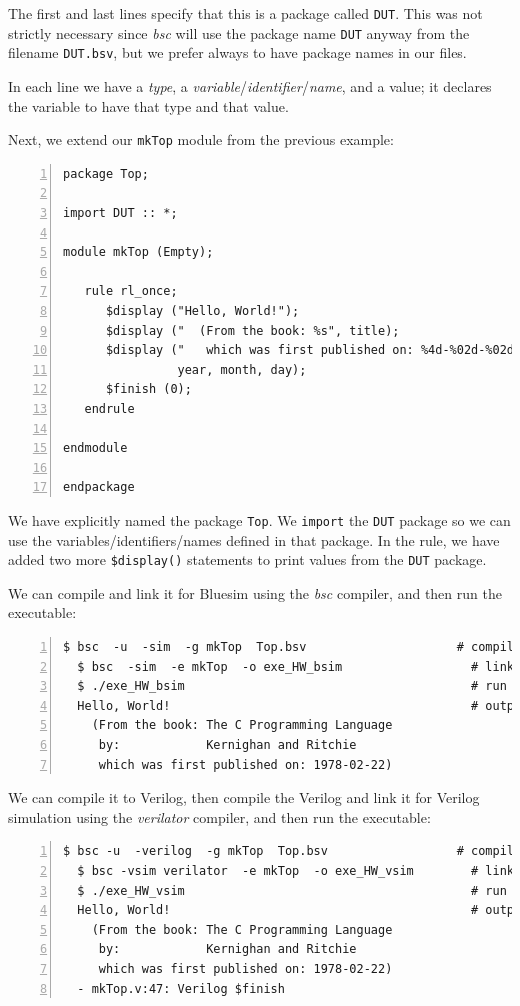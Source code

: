 The first and last lines specify that this is a package called
\verb|DUT|.  This was not strictly necessary since \emph{bsc} will use
the package name \verb|DUT| anyway from the filename \verb|DUT.bsv|,
but we prefer always to have package names in our files.

In each line we have a \emph{type}, a
\emph{variable}/\emph{identifier}/\emph{name}, and a value; it
declares the variable to have that type and that value.

Next, we extend our \verb|mkTop| module from the previous example:

{\small
\begin{Verbatim}[frame=single, numbers=left, label=in file Ex\_04\_02/Top.bsv]
package Top;

import DUT :: *;

module mkTop (Empty);

   rule rl_once;
      $display ("Hello, World!");
      $display ("  (From the book: %s", title);
      $display ("   which was first published on: %4d-%02d-%02d)",
                year, month, day);
      $finish (0);
   endrule

endmodule

endpackage
\end{Verbatim}
}

We have explicitly named the package \verb|Top|.  We \verb|import| the
\verb|DUT| package so we can use the variables/identifiers/names
defined in that package.  In the rule, we have added two more
\verb|$display()| statements to print values from the \verb|DUT|
package.

We can compile and link it for Bluesim using the \emph{bsc} compiler,
and then run the executable:

{\small
\begin{Verbatim}[frame=single, numbers=left]
  $ bsc  -u  -sim  -g mkTop  Top.bsv                     # compile
  $ bsc  -sim  -e mkTop  -o exe_HW_bsim                  # link
  $ ./exe_HW_bsim                                        # run
  Hello, World!                                          # output
    (From the book: The C Programming Language
     by:            Kernighan and Ritchie
     which was first published on: 1978-02-22)
\end{Verbatim}
}

We can compile it to Verilog, then compile the Verilog and link it for
Verilog simulation using the \emph{verilator} compiler, and then run
the executable:

{\small
\begin{Verbatim}[frame=single, numbers=left]
  $ bsc -u  -verilog  -g mkTop  Top.bsv                  # compile -> mkTop.v
  $ bsc -vsim verilator  -e mkTop  -o exe_HW_vsim        # link
  $ ./exe_HW_vsim                                        # run
  Hello, World!                                          # output
    (From the book: The C Programming Language
     by:            Kernighan and Ritchie
     which was first published on: 1978-02-22)
  - mkTop.v:47: Verilog $finish
\end{Verbatim}
}

